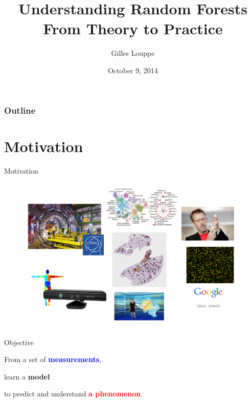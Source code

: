 \documentclass{beamer}
\title{{\bf Understanding Random Forests}\\
From Theory to Practice}
\author{Gilles Louppe}
\institute{Université de Liège, Belgium}
\date{October 9, 2014}
\newcommand{\X}[1]{\textcolor{blue}{#1}}
\newcommand{\y}[1]{\textcolor{red}{#1}}
\newcommand{\model}[1]{\textcolor{mygreen}{#1}}
\begin{document}

\begin{frame}
\titlepage
\end{frame}



\begin{frame}
  \frametitle{Outline}
  \tableofcontents
\end{frame}

\section{Motivation}

\begin{frame}{Motivation}

\begin{figure}
\vspace{-0.5cm}
\includegraphics[scale=0.4]{./figures/motivation.png}
\end{figure}

\end{frame}

\begin{frame}{Objective}

\begin{center}
From a set of {\bf \X{measurements}},

\vspace{1cm}
learn a {\bf \model{model}}
\vspace{1cm}

to predict and understand {\bf \y{a phenomenon}}.
\end{center}

\end{frame}
\end{document}
